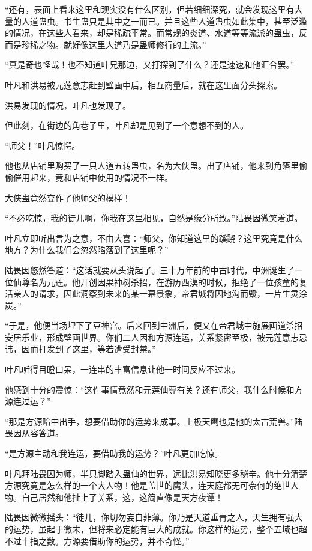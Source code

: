 \begin{this_body}
“还有，表面上看来这里和现实没有什么区别，但若细细深究，就会发现这里有大量的人道蛊虫。书生蛊只是其中之一而已。并且这些人道蛊虫如此集中，甚至泛滥的情况，在这些人看来，却是稀疏平常。而常规的炎道、水道等等流派的蛊虫，反而是珍稀之物。就好像这里人道乃是蛊师修行的主流。”

“真是奇也怪哉！也不知道叶兄那边，又打探到了什么？还是速速和他汇合罢。”

叶凡和洪易被元莲意志赶到壁画中后，相互商量后，就在这里面分头探索。

洪易发现的情况，叶凡也发现了。

但此刻，在街边的角巷子里，叶凡却是见到了一个意想不到的人。

“师父！”叶凡惊愕。

他也从店铺里购买了一只人道五转蛊虫，名为大侠蛊。出了店铺，他来到角落里偷偷催用起来，竟和店铺中使用的情况不一样。

大侠蛊竟然变作了他师父的模样！

“不必吃惊，我的徒儿啊，你我在这里相见，自然是缘分所致。”陆畏因微笑着道。

叶凡立即听出言为之意，不由大喜：“师父，你知道这里的蹊跷？这里究竟是什么地方？为什么我们会忽然陷落到了这里呢？”

陆畏因悠然答道：“这话就要从头说起了。三十万年前的中古时代，中洲诞生了一位仙尊名为元莲。他开创因果神树杀招，在游历西漠的时候，拒绝了一位孩童的复活亲人的请求，因此洞察到未来的某一幕景象，帝君城将因地沟而毁，一片生灵涂炭。”

“于是，他便当场埋下了豆神宫。后来回到中洲后，便又在帝君城中施展画道杀招安居乐业，形成壁画世界。你们二人因和方源连运，关系紧密至极，被元莲意志忌讳，因而打发到了这里，等若遭受封禁。”

叶凡听得目瞪口呆，一连串的丰富信息让他一时间反应不过来。

他感到十分的震惊：“这件事情竟然和元莲仙尊有关？还有师父，我什么时候和方源连过运？”

“那是方源暗中出手，想要借助你的运势来成事。上极天鹰也是他的太古荒兽。”陆畏因从容答道。

“是方源主动和我连运，要借助我的运势？”叶凡更加吃惊。

叶凡拜陆畏因为师，半只脚踏入蛊仙的世界，远比洪易知晓更多秘辛。他十分清楚方源究竟是怎么样的一个大人物！他是盖世的魔头，连天庭都无可奈何的绝世人物。自己居然和他扯上了关系，这，这简直像是天方夜谭！

陆畏因微微摇头：“徒儿，你切勿妄自菲薄。你乃是天道垂青之人，天生拥有强大的运势，虽起于微末，但将来必定能有巨大的成就。你这样的运势，整个五域也超不过十指之数。方源要借助你的运势，并不奇怪。”


\end{this_body}
